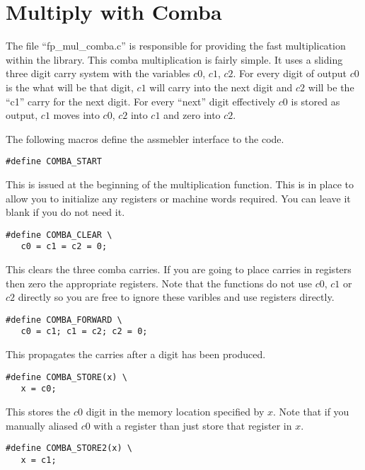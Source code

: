 \documentclass[b5paper]{book}
\begin{document}
\section{Multiply with Comba}
The file ``fp\_mul\_comba.c'' is responsible for providing the fast multiplication within the 
library.  This comba multiplication is fairly simple.  It uses a sliding three digit carry 
system with the variables $c0$, $c1$, $c2$.  For every digit of output $c0$ is the what will
be that digit, $c1$ will carry into the next digit and $c2$ will be the ``c1'' carry for
the next digit.  For every ``next'' digit effectively $c0$ is stored as output, $c1$ moves into
$c0$, $c2$ into $c1$ and zero into $c2$.

The following macros define the assmebler interface to the code.

\begin{verbatim}
#define COMBA_START 
\end{verbatim}

This is issued at the beginning of the multiplication function.  This is in place to allow you to
initialize any registers or machine words required.  You can leave it blank if you do not need 
it.

\begin{verbatim}
#define COMBA_CLEAR \
   c0 = c1 = c2 = 0;
\end{verbatim}

This clears the three comba carries.  If you are going to place carries in registers then 
zero the appropriate registers.  Note that the functions do not use $c0$, $c1$ or $c2$ directly
so you are free to ignore these varibles and use registers directly.

\begin{verbatim}
#define COMBA_FORWARD \
   c0 = c1; c1 = c2; c2 = 0;
\end{verbatim}

This propagates the carries after a digit has been produced.  

\begin{verbatim}
#define COMBA_STORE(x) \
   x = c0;
\end{verbatim}

This stores the $c0$ digit in the memory location specified by $x$.  Note that if you manually 
aliased $c0$ with a register than just store that register in $x$.  

\begin{verbatim}
#define COMBA_STORE2(x) \
   x = c1;
\end{verbatim}
\end{document}
